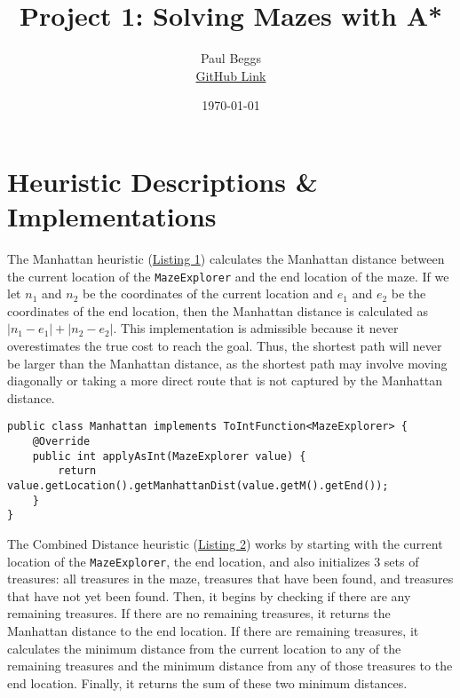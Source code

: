 \documentclass[12pt]{article}
\title{Project 1: Solving Mazes with A*}
\author{Paul Beggs \\ \href{https://github.com/PaulBeggs/A_Star}{GitHub Link}}
\date{\today}
\begin{document}
\maketitle

\section{Heuristic Descriptions \& Implementations}

The Manhattan heuristic (\hyperref[list:manhattan]{Listing 1}) calculates the Manhattan distance between the current location of the \texttt{MazeExplorer} and the end location of the maze. If we let \(n_{1}\) and \(n_{2}\) be the coordinates of the current location and \(e_{1}\) and \(e_{2}\) be the coordinates of the end location, then the Manhattan distance is calculated as \(|n_{1} - e_{1}| + |n_{2} - e_{2}|\). This implementation is admissible because it never overestimates the true cost to reach the goal. Thus, the shortest path will never be larger than the Manhattan distance, as the shortest path may involve moving diagonally or taking a more direct route that is not captured by the Manhattan distance.

\label{list:manhattan}
\begin{verbatim}
public class Manhattan implements ToIntFunction<MazeExplorer> {
    @Override
    public int applyAsInt(MazeExplorer value) {
        return value.getLocation().getManhattanDist(value.getM().getEnd());
    }
}
\end{verbatim}
\vspace{2em}

The Combined Distance heuristic (\hyperref[list:combined]{Listing 2}) works by starting with the current location of the \texttt{MazeExplorer}, the end location, and also initializes 3 sets of treasures: all treasures in the maze, treasures that have been found, and treasures that have not yet been found. Then, it begins by checking if there are any remaining treasures. If there are no remaining treasures, it returns the Manhattan distance to the end location. If there are remaining treasures, it calculates the minimum distance from the current location to any of the remaining treasures and the minimum distance from any of those treasures to the end location. Finally, it returns the sum of these two minimum distances. 
\end{document}
